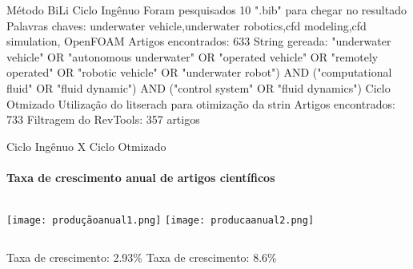 \begin{frame}[t]{Método BiLi}
    Ciclo Ingênuo 
    \newline
        Foram pesquisados 10 ".bib" para chegar no resultado 
    \newline
        Palavras chaves: underwater vehicle,underwater robotics,cfd modeling,cfd simulation, OpenFOAM
    \newline
        Artigos encontrados: 633
    \newline
        String gereada: "underwater vehicle" OR "autonomous underwater" OR "operated vehicle" OR
        "remotely operated" OR "robotic vehicle" OR "underwater robot") AND ("computational fluid" OR "fluid dynamic") 
        AND ("control system" OR "fluid dynamics")
    \newline
    Ciclo Otmizado
    \newline
        Utilização do litserach para otimização da strin
    \newline
        Artigos encontrados: 733
    \newline
        Filtragem do RevTools: 357 artigos

\end{frame}
\begin{frame}[t]{Ciclo Ingênuo X Ciclo Otmizado}
    \transboxout[duration=0.5]
    \framesubtitle{Taxa de crescimento anual de artigos científicos}
    
    \begin{columns}
        \newline  
            \texttt{[image: produçãoanual1.png]}
        \newline  
         \texttt{[image: producaanual2.png]}
    \end{columns}
    
    \begin{columns}
        \newline  
        Taxa de crescimento: 2.93\%
        \newline
         Taxa de crescimento: 8.6\%
    \end{columns}
\end{frame}
